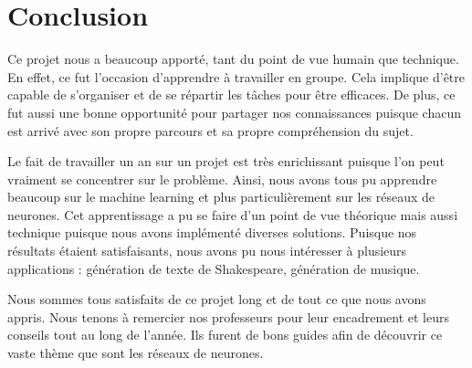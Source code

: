 \chapter*{Conclusion}

Ce projet nous a beaucoup apporté, tant du point de vue humain que technique. En effet, ce fut l'occasion d'apprendre à travailler en groupe. Cela implique d'être capable de s'organiser et de se répartir les tâches pour être efficaces. De plus, ce fut aussi une bonne opportunité pour partager nos connaissances puisque chacun est arrivé avec son propre parcours et sa propre compréhension du sujet.

Le fait de travailler un an sur un projet est très enrichissant puisque l'on peut vraiment se concentrer sur le problème. Ainsi, nous avons tous pu apprendre beaucoup sur le machine learning et plus particulièrement sur les réseaux de neurones. Cet apprentissage a pu se faire d'un point de vue théorique mais aussi technique puisque nous avons implémenté diverses solutions. Puisque nos résultats étaient satisfaisants, nous avons pu nous intéresser à plusieurs applications : génération de texte de Shakespeare, génération de musique.

Nous sommes tous satisfaits de ce projet long et de tout ce que nous avons appris. Nous tenons à remercier nos professeurs pour leur encadrement et leurs conseils tout au long de l'année. Ils furent de bons guides afin de découvrir ce vaste thème que sont les réseaux de neurones.